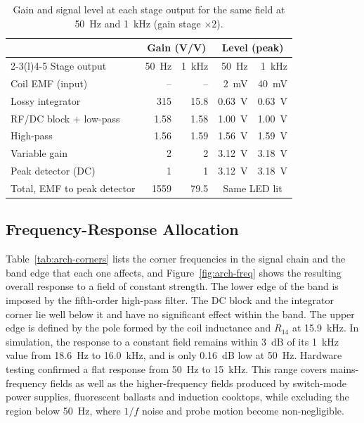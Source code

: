 \documentclass[11pt,a4paper]{article}
\begin{document}
\begin{table}[htbp]
  \centering
  \caption{Gain and signal level at each stage output for the same field
           at \SI{50}{\hertz} and \SI{1}{\kilo\hertz} (gain stage $\times2$).}
  \label{tab:arch-budget}
  \small
  \begin{tabular}{@{}lrrrr@{}}
    \toprule
    & \multicolumn{2}{c}{Gain (V/V)} & \multicolumn{2}{c}{Level (peak)} \\
    \cmidrule(lr){2-3}\cmidrule(l){4-5}
    Stage output & \SI{50}{\hertz} & \SI{1}{\kilo\hertz} & \SI{50}{\hertz} & \SI{1}{\kilo\hertz} \\
    \midrule
    Coil EMF (input)         & --   & --   & \SI{2}{\milli\volt} & \SI{40}{\milli\volt} \\
    Lossy integrator         & 315  & 15.8 & \SI{0.63}{\volt} & \SI{0.63}{\volt} \\
    RF/DC block + low-pass   & 1.58 & 1.58 & \SI{1.00}{\volt} & \SI{1.00}{\volt} \\
    High-pass                & 1.56 & 1.59 & \SI{1.56}{\volt} & \SI{1.59}{\volt} \\
    Variable gain            & 2    & 2    & \SI{3.12}{\volt} & \SI{3.18}{\volt} \\
    Peak detector (DC)       & 1    & 1    & \SI{3.12}{\volt} & \SI{3.18}{\volt} \\
    \midrule
    Total, EMF to peak detector & 1559 & 79.5 & \multicolumn{2}{c}{Same LED lit} \\
    \bottomrule
  \end{tabular}
\end{table}

\subsection{Frequency-Response Allocation}
\label{sec:arch-freq}

Table~\ref{tab:arch-corners} lists the corner frequencies in the signal chain and the band edge that each one affects, and Figure~\ref{fig:arch-freq} shows the resulting overall response to a field of constant strength. The lower edge of the band is imposed by the fifth-order high-pass filter. The DC block and the integrator corner lie well below it and have no significant effect within the band. The upper edge is defined by the pole formed by the coil inductance and $R_{14}$ at \SI{15.9}{\kilo\hertz}. In simulation, the response to a constant field remains within \SI{3}{\deci\bel} of its \SI{1}{\kilo\hertz} value from \SI{18.6}{\hertz} to \SI{16.0}{\kilo\hertz}, and is only \SI{0.16}{\deci\bel} low at \SI{50}{\hertz}. Hardware testing confirmed a flat response from \SI{50}{\hertz} to \SI{15}{\kilo\hertz}. This range covers mains-frequency fields as well as the higher-frequency fields produced by switch-mode power supplies, fluorescent ballasts and induction cooktops, while excluding the region below \SI{50}{\hertz}, where $1/f$ noise and probe motion become non-negligible.
\end{document}

